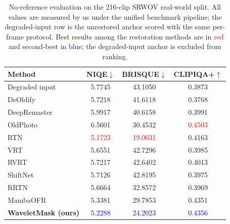\documentclass[applsci,article,submit,pdftex,moreauthors]{Definitions/mdpi}
\begin{document}
\begin{table}[H]
\caption{No-reference evaluation on the 216-clip SRWOV real-world split. All values are measured by us under the unified benchmark pipeline; the degraded-input row is the unrestored anchor scored with the same per-frame protocol. Best results among the restoration methods are in \textcolor{red}{red} and second-best in \textcolor{blue}{blue}; the degraded-input anchor is excluded from ranking.\label{tab:realworld_literature}}
\footnotesize
\begin{tabularx}{\textwidth}{lCCC}
\toprule
\textbf{Method} & \textbf{NIQE$\downarrow$} & \textbf{BRISQUE$\downarrow$} & \textbf{CLIPIQA+$\uparrow$} \\
\midrule
Degraded input                              & 5.7745 & 43.1050 & 0.3873 \\
DeOldify~\cite{jantic2019deoldify}          & 5.7218 & 41.6118 & 0.3768 \\
DeepRemaster~\cite{iizuka2019deepremaster}  & 5.9917 & 40.6158 & 0.3991 \\
OldPhoto~\cite{wan2020bringing}             & 6.5601 & 30.4532 & \textcolor{red}{0.4503} \\
RTN~\cite{rtn2022}                          & \textcolor{red}{5.1723} & \textcolor{red}{19.0031} & 0.4163 \\
VRT~\cite{liang2024vrt}                     & 5.6551 & 42.7296 & 0.3985 \\
RVRT~\cite{liang2022rvrt}                   & 5.7217 & 42.6402 & 0.4013 \\
ShiftNet~\cite{li2023shiftnet}              & 5.7126 & 42.8195 & 0.3975 \\
RRTN~\cite{rrtn2024}                        & 5.6664 & 32.8572 & 0.3969 \\
MambaOFR~\cite{mao2025mambaofr}             & 5.3381 & 29.7853 & 0.4351 \\
\midrule
\textbf{WaveletMask (ours)}                 & \textcolor{blue}{5.2288} & \textcolor{blue}{24.2023} & \textcolor{blue}{0.4356} \\
\bottomrule
\end{tabularx}
\normalsize
\end{table}
\end{document}
